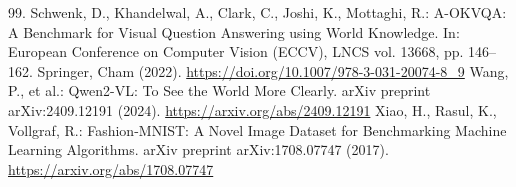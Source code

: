 \documentclass[graybox]{svmult}
\begin{document}
\begin{thebibliography}{99.}
Schwenk, D., Khandelwal, A., Clark, C., Joshi, K., Mottaghi, R.: A-OKVQA: A Benchmark for Visual Question Answering using World Knowledge. In: European Conference on Computer Vision (ECCV), LNCS vol. 13668, pp. 146–162. Springer, Cham (2022). \url{https://doi.org/10.1007/978-3-031-20074-8_9}
Wang, P., et al.: Qwen2-VL: To See the World More Clearly. arXiv preprint arXiv:2409.12191 (2024). \url{https://arxiv.org/abs/2409.12191}
Xiao, H., Rasul, K., Vollgraf, R.: Fashion-MNIST: A Novel Image Dataset for Benchmarking Machine Learning Algorithms. arXiv preprint arXiv:1708.07747 (2017). \url{https://arxiv.org/abs/1708.07747}
\end{thebibliography}
\end{document}
